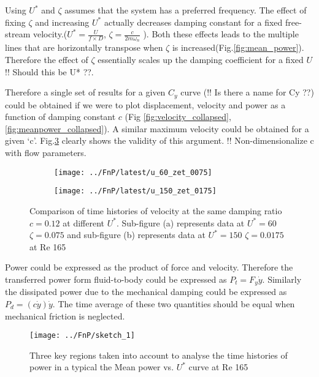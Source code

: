  Using $U^*$ and $\zeta$ assumes that the system has a preferred frequency. The effect of fixing $\zeta$ and increasing $U^*$ actually decreases damping constant for a fixed free-stream velocity.($U^*=\frac{U}{f \times D}$, $\zeta= \frac{c}{2 m \omega_n}$ ). Both these effects leads to the multiple lines that are horizontally transpose when $\zeta$ is increased(Fig.\ref{fig:mean_power}). Therefore the effect of $\zeta$ essentially scales up the damping coefficient for a fixed $U$ !! Should this be U* ??. 
 \vspace{1cm}
 
 Therefore a single set of results for a given $C_y$ curve (!! Is there a name for Cy ??) could be obtained if we were to plot displacement, velocity and power as a function of damping constant $c$ (Fig \ref{fig:velocity_collapsed}, \ref{fig:meanpower_collapsed}). A similar maximum velocity could be obtained for a given `c'. Fig.\ref{fig:same_max_vel} clearly shows the validity of this argument. !! Non-dimensionalize c with flow parameters.


 
 \begin{figure}[h!]
 \begin{subfigure}[b]{0.5\textwidth}
 \centering
 \label{fig:u_60_zet_0075}
 \texttt{[image: ../FnP/latest/u\_60\_zet\_0075]}
 \caption{}
 \end{subfigure}
 
 \begin{subfigure}[b]{0.5\textwidth}
 \centering
 \label{fig:u_150_zet_017}
 \texttt{[image: ../FnP/latest/u\_150\_zet\_0175]}
 \caption{}
 \end{subfigure}
 \caption{Comparison of time histories of velocity at the same damping ratio $c=0.12$ at different $U^*$. Sub-figure (a) represents data at $U^*=60$ $\zeta=0.075$ and sub-figure (b) represents data at $U^*=150$ $\zeta=0.0175$ at Re 165 }
 \label{fig:same_max_vel}
 \end{figure}
 
 Power could be expressed as the product of force and velocity. Therefore the transferred power form fluid-to-body could be expressed as $P_t=F_y\dot{y}$. Similarly the dissipated power due to the mechanical damping could be expressed as $P_d=(c\dot{y})\dot{y}$. The time average of these two quantities should be equal when mechanical friction is neglected.


\begin{figure}[h!]
\centering
\texttt{[image: ../FnP/sketch\_1]}
\caption{ Three key regions taken into account to analyse the time histories of power in a typical the Mean power vs. $U^*$ curve at Re 165 }
\label{fig:regions_1}
\end{figure}



